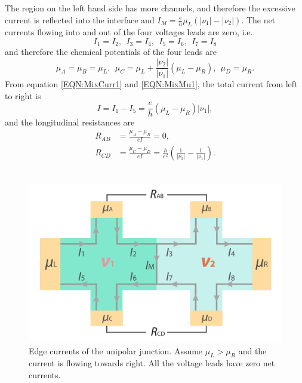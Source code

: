 \documentclass[pdflatex, sectionletters, 12pt]{pittetd}    %
\begin{document}
The region on the left hand side has more channels, and therefore the excessive current is reflected into the interface and $I_M = \frac{e}{h}\mu_L(|\nu_1|-|\nu_2|)$. The net currents flowing into and out of the four voltages leads are zero, i.e.
$$
I_1 = I_2, \ \ I_3 = I_4, \ \ I_5 = I_6, \ \ I_7 = I_8
$$
and therefore the chemical potentials of the four leads are
\begin{equation}
\label{EQN:MixMu1}
\mu_A = \mu_B = \mu_L, \ \ \mu_C = \mu_L + \frac{|\nu_2|}{|\nu_1|}(\mu_L - \mu_R), \ \ \mu_D = \mu_R.
\end{equation}
From equation \ref{EQN:MixCurr1} and \ref{EQN:MixMu1}, the total current from left to right is 
$$
I = I_1 - I_5 = \frac{e}{h}(\mu_L - \mu_R)|\nu_1|,
$$ 
and the longitudinal resistances are 
\begin{equation}
\label{EQN:Mixing1}
\begin{split}
R_{AB} & = \frac{\mu_A - \mu_B}{eI} = 0, \\
R_{CD} & = \frac{\mu_C - \mu_D}{eI} = \frac{h}{e^2}\left(\frac{1}{|\nu_2|} - \frac{1}{|\nu_1|}\right).
\end{split}
\end{equation}
\\

\begin{figure}[h!]
	\centering
	\includegraphics[width=.7\textwidth]{Drawing/Unipolar.pdf}
	\caption{Edge currents of the unipolar junction. Assume $\mu_L > \mu_R$ and the current is flowing towards right. All the voltage leads have zero net currents. }
	\label{FIG:Unipolar}
\end{figure}
\end{document}
